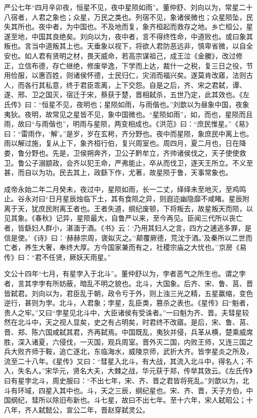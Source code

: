 \documentclass[]{article}
\begin{document}
严公七年``四月辛卯夜，恒星不见，夜中星陨如雨''。董仲舒、刘向以为，常星二十八宿者，人君之象也；众星，万民之类也。列宿不见，象诸侯微也；众星陨坠，民失其所也。夜中者，为中国也。不及地而复，象齐桓起而救存之地。乡亡桓公，星遂至地，中国其良绝矣。刘向以为，夜中者，言不得终性命，中道败也。或曰象其叛也。言当中道叛其上也。天垂象以视下，将欲人君防恶远非，慎卑省微，以自全安也。如人君有贤明之材，畏天威命，若高宗谋祖己，成王泣《金縢》，改过修正，立信布德，存亡继绝，修废举逸，下学而上达，裁什一之税，复三日之役，节用俭服，以惠百姓，则诸侯怀德，士民归仁，灾消而福兴矣。遂莫肯改寤，法则古人，而各行其私意，终于君臣乖离，上下交怨。自是之后，齐、宋之君弑，谭、遂、邢、卫之国灭，宿迁于宋，蔡获于楚，晋相弑杀，五世乃定，此其效也。《左氏传》曰：``恒星不见，夜明也；星陨如雨，与雨偕也。''刘歆以为昼象中国，夜象夷狄。夜明，故常见之星皆不见，象中国微也。``星陨如雨''，如，而也，星陨而且雨，故曰``与雨偕也''，明雨与星陨，两变相成也。《洪范》曰：``庶民惟星。''《易》曰：``雷雨作，`解'。''是岁，岁在玄枵，齐分野也。夜中而星陨，象庶民中离上也。雨以解过施，复从上下，象齐桓行伯，复兴周室也。周四月，夏二月也，日在降娄，鲁分野也。先是，卫侯朔奔齐，卫公子黔牟立，齐帅诸侯伐之，天子使使救卫。鲁公子溺颛政，会齐以犯王命，严弗能止，卒从而伐卫，逐天王所立。不义至甚，而自以为功。民去其上，政繇下作，尤著，故星陨于鲁，天事常象也。

成帝永始二年二月癸未，夜过中，星陨如雨，长一二丈，绎绎未至地灭，至鸡鸣止。谷永对曰``日月星辰烛临下土，其有食陨之异，则遐迩幽隐靡不咸睹。星辰附离于天，犹庶民附离王者也。王者失道，纲纪废顿，下将叛去，故星叛天而陨，以见其象。《春秋》记异，星陨最大，自鲁严以来，至今再见。臣闻三代所以丧亡者，皆繇妇人群小，湛湎于酒。《书》云：`乃用其妇人之言，四方之逋逃多罪，是信是使。'《诗》曰：`赫赫宗周，褒姒灭之。'`颠覆厥德，荒沈于酒。'及秦所以二世而亡者，养生大奢，奉终大厚。方今国家兼而有之，社稷宗庙之大忧也。''京房《易传》曰：``君不任贤，厥妖天雨星。''

文公十四年``七月，有星孛入于北斗''。董仲舒以为，孛者恶气之所生也。谓之孛者，言其孛孛有所妨蔽，暗乱不明之貌也。北斗，大国象。后齐、宋、鲁、莒、晋皆弑君。刘向以为，君臣乱于朝，政令亏于外，则上浊三光之精，五星赢缩，变色逆行，甚则为孛。北斗，人君象；孛星，乱臣类，篡杀之表也。《星传》曰``魁者，贵人之牢。''又曰``孛星见北斗中，大臣诸侯有受诛者。''一曰魁为齐、晋。夫彗星较然在北斗中，天之视人显矣，史之有占明矣，时君终不改寤。是后，宋、鲁、莒、晋、郑、陈六国咸弑其君，齐再弑焉。中国既乱，夷狄并侵，兵革从横，楚乘威席胜，深入诸夏，六侵伐，一灭国，观兵周室。晋外灭二国，内败王师，又连三国之兵大败齐师于鞍，追亡逐北，东临海水，威陵京师，武折大齐。皆孛星炎之所及，流至二十八年。《星传》又曰：``彗星入北斗，有大战，其流入北斗中，得名人；不入，失名人。''宋华元，贤名大夫，大棘之战，华元获于郑，传举其效云。《左氏传》曰有星孛北斗，周史服曰：``不出七年，宋、齐、晋之君皆将死乱。''刘歆以为，北斗有环域，四星入其中也。斗，天之三辰，纲纪星也。宋、齐、晋，天子方伯，中国纲纪，彗所以除旧布新也。斗七星，故曰不出七年。至十六年，宋人弑昭公；十八年，齐人弑懿公，宣公二年，晋赵穿弑灵公。
\end{document}
